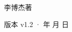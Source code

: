\begin{titlepage}
\vfill
{\LARGE\sffamily 李博杰\quad 著\par}
\vspace{0.7cm}
{\small\sffamily\color{structurecolor!80} 版本 v1.2 · \number\year 年 \number\month 月 \number\day 日\par}
\vspace{1.2cm}
\end{titlepage}

